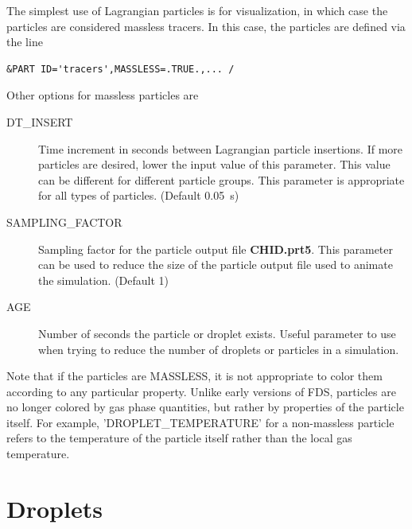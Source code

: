 \documentclass[11pt]{book}
\begin{document}
The simplest use of Lagrangian particles is for visualization, in which case the
particles are considered massless tracers. In this case, the particles are
defined via the line

\footnotesize
\begin{verbatim}
&PART ID='tracers',MASSLESS=.TRUE.,... /
\end{verbatim}
\normalsize

\noindent
Other options for massless particles are
\begin{description}
\item[{\ct DT\_INSERT}]    Time increment in seconds between Lagrangian particle insertions.
If more particles are desired, lower the input value of this parameter. This value can be different
for different particle groups. This parameter is appropriate for all types of particles. (Default 0.05~s)
\item[{\ct SAMPLING\_FACTOR}]     Sampling factor for the particle output
file {\bf CHID.prt5}. This parameter can be used to reduce the size
of the particle output file used to animate the simulation. (Default 1)
\item[{\ct AGE}]  Number of seconds the particle or droplet exists. Useful parameter to use when
trying to reduce the number of droplets or particles in a simulation.
\end{description}
Note that if the
particles are {\ct MASSLESS}, it is not appropriate to color them according to any particular property.
Unlike early versions of FDS, particles are no longer
colored by gas phase quantities, but rather by properties of the particle itself. For example,
{\ct 'DROPLET\_TEMPERATURE'} for a non-massless particle refers to the temperature of the particle itself
rather than the local gas temperature.


\section{Droplets}
\end{document}
